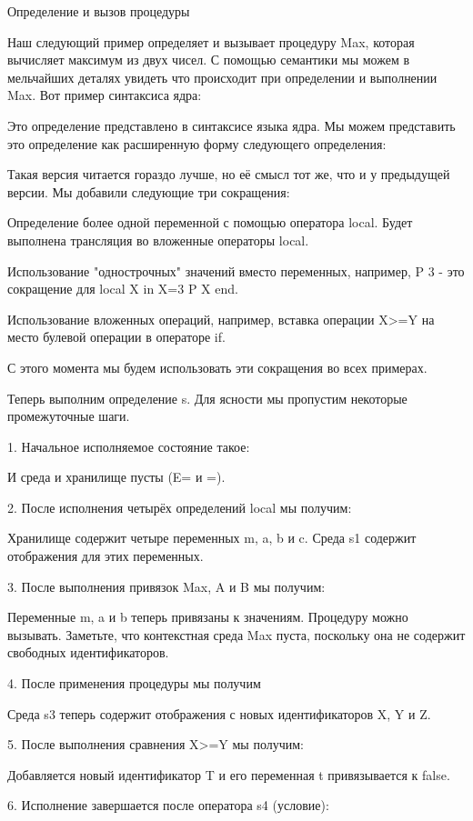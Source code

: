 Определение и вызов процедуры

Наш следующий пример определяет и вызывает процедуру Max, которая вычисляет максимум из двух чисел. С помощью семантики мы можем в мельчайших деталях увидеть что происходит при определении и выполнении Max. Вот пример синтаксиса ядра:

Это определение представлено в синтаксисе языка ядра. Мы можем представить это определение как расширенную форму следующего определения:

Такая версия читается гораздо лучше, но её смысл тот же, что и у предыдущей версии. Мы добавили следующие три сокращения:

Определение более одной переменной с помощью оператора local. Будет выполнена трансляция во вложенные операторы local.

Использование "однострочных" значений вместо переменных, например, {P 3} - это сокращение для local X in X=3 {P X} end.

Использование вложенных операций, например, вставка операции X>=Y на место булевой операции в операторе if.

С этого момента мы будем использовать эти сокращения во всех примерах.

Теперь выполним определение s. Для ясности мы пропустим некоторые промежуточные шаги.

1. Начальное исполняемое состояние такое:

И среда и хранилище пусты (E= и =).

2. После исполнения четырёх определений local мы получим:

Хранилище содержит четыре переменных m, a, b и c. Среда s1 содержит отображения для этих переменных.

3. После выполнения привязок Max, A и B мы получим:

Переменные m, a и b теперь привязаны к значениям. Процедуру можно вызывать. Заметьте, что контекстная среда Max пуста, поскольку она не содержит свободных идентификаторов.

4. После применения процедуры мы получим

Среда s3 теперь содержит отображения с новых идентификаторов X, Y и Z.

5. После выполнения сравнения X>=Y мы получим:

Добавляется новый идентификатор T и его переменная t привязывается к false.

6. Исполнение завершается после оператора s4 (условие):

